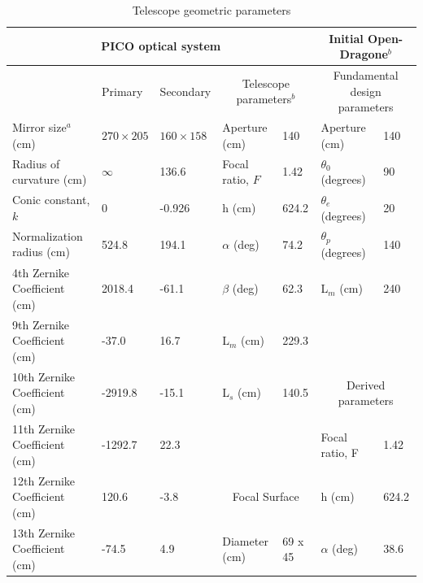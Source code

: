 \documentclass[]{spie}  %
\begin{document}
\begin{table}[ht]
\centering
\caption{Telescope geometric parameters  \label{tab:optics}}

\begin{adjustbox}{width=1.05\textwidth}
\hspace{-1cm}
\begin{tabular}{|l|llll||ll|}
\hline
\multicolumn{5}{|c||}{PICO optical system}                                    & \multicolumn{2}{c|}{Initial Open-Dragone$^b$}     \\ \hline
                          & Primary           & Secondary    & \multicolumn{2}{c||}{Telescope parameters$^b$} & \multicolumn{2}{c|}{Fundamental design parameters}  \\
Mirror size$^a$ (cm)      & $270 \times 205$ & $160 \times 158$ & Aperture (cm)           & 140      & Aperture (cm)                  & 140   \\
Radius of curvature (cm)  & $\infty$         & 136.6             & Focal ratio, $F$           & 1.42     & $\theta_0$ (degrees)           & 90    \\
Conic constant, $k$       & 0                 & -0.926            & h (cm)                    & 624.2    & $\theta_e$ (degrees)           & 20    \\
Normalization radius (cm) & 524.8             & 194.1             & $\alpha$ (deg)            & 74.2     & $\theta_p$ (degrees)           & 140   \\
4th Zernike Coefficient (cm)  & 2018.4            & -61.1             & $\beta$  (deg)            &  62.3    & L$_m$ (cm)                     & 240   \\
9th Zernike Coefficient (cm)  & -37.0             & 16.7              & L$_m$ (cm)                &   229.3  &                                &         \\
10th Zernike Coefficient (cm) & -2919.8           & -15.1             & L$_s$ (cm)                &   140.5  & \multicolumn{2}{c|}{Derived parameters} \\ 
11th Zernike Coefficient (cm) & -1292.7           & 22.3              &                           &          & Focal ratio, F                 & 1.42  \\   
12th Zernike Coefficient (cm) & 120.6             & -3.8             &   \multicolumn{2}{c||}{Focal Surface}  & h (cm)                         & 624.2 \\   
13th Zernike Coefficient (cm) & -74.5             & 4.9               & Diameter (cm)             & 69 x 45  & $\alpha$ (deg)                 & 38.6  \\   

\end{tabular}
\end{adjustbox}
\end{table}
\end{document}
